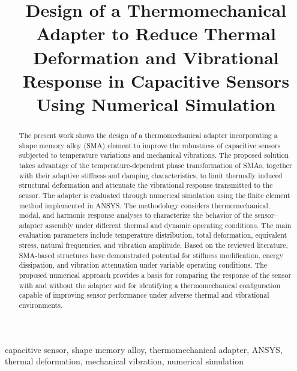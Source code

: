 \documentclass[conference]{IEEEtran}
\begin{document}
\title{Design of a Thermomechanical Adapter to Reduce Thermal Deformation and Vibrational Response in Capacitive Sensors Using Numerical Simulation}

\author{
\and
{}
}

\maketitle

\begin{abstract}
The present work shows the design of a thermomechanical adapter incorporating a shape memory alloy (SMA) element to improve the robustness of capacitive sensors subjected to temperature variations and mechanical vibrations. The proposed solution takes advantage of the temperature-dependent phase transformation of SMAs, together with their adaptive stiffness and damping characteristics, to limit thermally induced structural deformation and attenuate the vibrational response transmitted to the sensor. The adapter is evaluated through numerical simulation using the finite element method implemented in ANSYS. The methodology considers thermomechanical, modal, and harmonic response analyses to characterize the behavior of the sensor--adapter assembly under different thermal and dynamic operating conditions. The main evaluation parameters include temperature distribution, total deformation, equivalent stress, natural frequencies, and vibration amplitude. Based on the reviewed literature, SMA-based structures have demonstrated potential for stiffness modification, energy dissipation, and vibration attenuation under variable operating conditions. The proposed numerical approach provides a basis for comparing the response of the sensor with and without the adapter and for identifying a thermomechanical configuration capable of improving sensor performance under adverse thermal and vibrational environments.
\end{abstract}

\renewcommand\IEEEkeywordsname{Keywords}

\begin{IEEEkeywords}
capacitive sensor, shape memory alloy, thermomechanical adapter, ANSYS, thermal deformation, mechanical vibration, numerical simulation
\end{IEEEkeywords}
\end{document}
